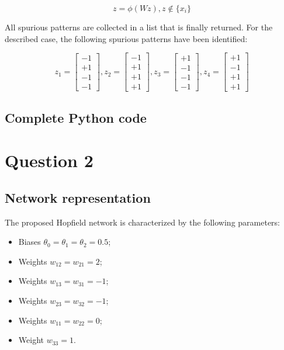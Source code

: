 \documentclass[letterpaper,headings=standardclasses]{scrartcl}
\begin{document}
$$ z = \phi(Wz), z \notin \{x_i\} $$

All spurious patterns are collected in a list that is finally returned. For the described case, the following spurious patterns have been identified:

$$ z_1 = \left[\begin{matrix} -1 \\ +1 \\ -1 \\ -1 \end{matrix}\right], z_2 = \left[\begin{matrix} -1 \\ +1 \\ +1 \\ +1 \end{matrix}\right], z_3 = \left[\begin{matrix} +1 \\ -1 \\ -1 \\ -1 \end{matrix}\right], z_4 = \left[\begin{matrix} +1 \\ -1 \\ +1 \\ +1 \end{matrix}\right] $$

\subsection{Complete Python code}



\section{Question 2}

\subsection{Network representation}

The proposed Hopfield network is characterized by the following parameters:

\begin{itemize}
    \item Biases $\theta_0 = \theta_1 = \theta_2 = 0.5$;
    \item Weights $w_{12} = w_{21} = 2$;
    \item Weights $w_{13} = w_{31} = -1$;
    \item Weights $w_{23} = w_{32} = -1$;
    \item Weights $w_{11} = w_{22} = 0$;
    \item Weight $w_{33} = 1$.
\end{itemize}
\end{document}
